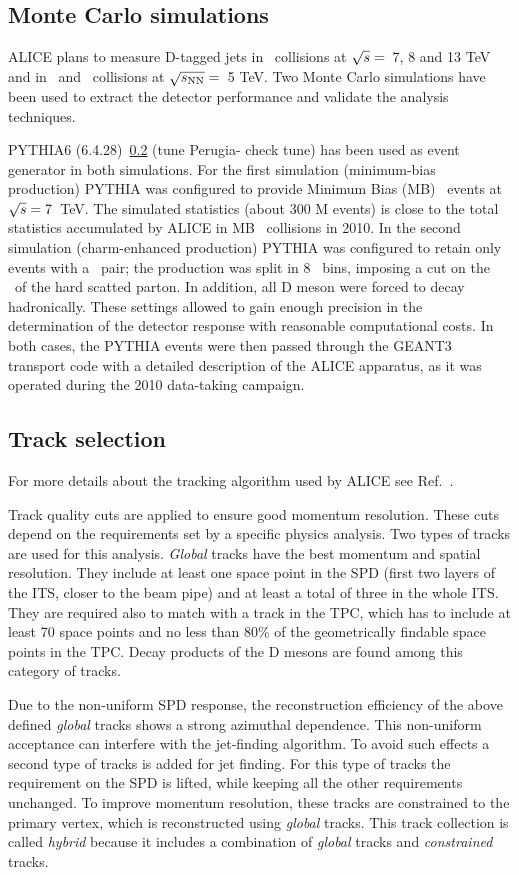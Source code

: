 \documentclass[a4paper]{jpconf}
\begin{document}
\subsection{Monte Carlo simulations}
ALICE plans to measure D-tagged jets in \pp\ collisions at $\sqrt{s}=$~7, 8 and 13 TeV and in \pPb\ and \PbPb\ collisions at $\sqrt{s_{\rm NN}}=$~5 TeV.
Two Monte Carlo simulations have been used to extract the detector performance and validate the analysis techniques.

PYTHIA6 (6.4.28)~\ref{} (tune Perugia-{\color{red} check tune}) has been used as event generator in both simulations.
For the first simulation (minimum-bias production) PYTHIA was configured to provide Minimum Bias (MB) \pp\ events at $\sqrt{s}=7$~TeV.
The simulated statistics (about 300 M events) is close to the total statistics accumulated by ALICE in MB \pp\ collisions
in 2010. In the second simulation (charm-enhanced production) PYTHIA was configured to retain only events with a \ccbar\ pair; the production
was split in 8 \pthard\ bins, imposing a cut on the \pT\ of the hard scatted parton. In addition, all D meson were forced
to decay hadronically. These settings allowed to gain enough precision in the determination of the detector response with reasonable
computational costs.
In both cases, the PYTHIA events were then passed through the GEANT3 transport code with a detailed description of the ALICE apparatus,
as it was operated during the 2010 data-taking campaign.

\subsection{Track selection}
For more details about the tracking algorithm used by ALICE see Ref.~\cite{ALICE:2014b}.

Track quality cuts are applied to ensure good momentum resolution. These cuts
depend on the requirements set by a specific physics analysis.
Two types of tracks are used for this analysis. \emph{Global} tracks have the best
momentum and spatial resolution. They include at least one space point in the SPD (first two
layers of the ITS, closer to the beam pipe) and at least a total of three in the whole ITS. They are required also to
match with a track in the TPC, which has to include at least 70 space points and no less than 80\% of the geometrically findable 
space points in the TPC. Decay products of the D mesons are found among this category of tracks.

Due to the non-uniform SPD response, the reconstruction efficiency of the above defined \emph{global} tracks shows a strong azimuthal dependence.
This non-uniform acceptance can interfere with the jet-finding algorithm. To avoid such effects a second type of tracks is added for jet finding.
For this type of tracks the requirement on the SPD is lifted, while keeping all the other requirements unchanged. To improve momentum resolution,
these tracks are constrained to the primary vertex, which is reconstructed using \emph{global} tracks. This track collection is called \emph{hybrid} because
it includes a combination of \emph{global} tracks and \emph{constrained} tracks.
\end{document}
